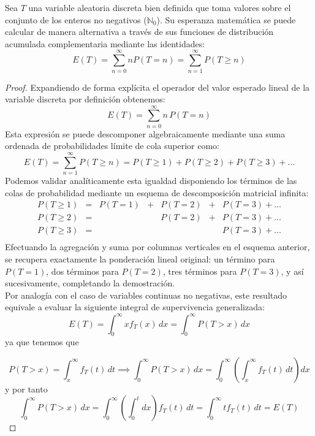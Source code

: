 \begin{lema}
    Sea $T$ una variable aleatoria discreta bien definida que toma valores sobre el conjunto de los enteros no negativos ($\mathbb{N}_0$). Su esperanza matemática se puede calcular de manera alternativa a través de sus funciones de distribución acumulada complementaria mediante las identidades:
    \[
    E(T) = \sum_{n=0}^{\infty} nP(T = n) = \sum_{n=1}^{\infty} P(T \geq n)
    \]
\begin{proof}
    Expandiendo de forma explícita el operador del valor esperado lineal de la variable discreta por definición obtenemos:
    \[
    E(T) = \sum_{n=0}^{\infty} n \, P(T = n)
    \]
    Esta expresión se puede descomponer algebraicamente mediante una suma ordenada de probabilidades límite de cola superior como:
    \[
    E(T) = \sum_{n=1}^{\infty} P(T \geq n) = P(T \geq 1) + P(T \geq 2) + P(T \geq 3) + \dots
    \]
    Podemos validar analíticamente esta igualdad disponiendo los términos de las colas de probabilidad mediante un esquema de descomposición matricial infinita:
    \[
    \begin{array}{rcccccc}
        P(T \geq 1) & = & P(T=1) & + & P(T=2) & + & P(T=3) + \dots \\
        P(T \geq 2) & = &                  &   & P(T=2) & + & P(T=3) + \dots \\
        P(T \geq 3) & = &                  &   &                  &   & P(T=3) + \dots \\
    \end{array}
    \]
    Efectuando la agregación y suma por columnas verticales en el esquema anterior, se recupera exactamente la ponderación lineal original: un término para $P(T=1)$, dos términos para $P(T=2)$, tres términos para $P(T=3)$, y así sucesivamente, completando la demostración. \\


    \noindent
    Por analogía con el caso de variables continuas no negativas, este resultado equivale a evaluar la siguiente integral de supervivencia generalizada:
    \[
    E(T)= \int_{0}^{\infty}xf_T(x)\, dx=\int_{0}^{\infty} P(T > x) \, dx 
    \]
    ya que tenemos que

    $$P(T > x) = \int_{x}^{\infty} f_T(t) \, dt \implies \int_{0}^{\infty} P(T > x) \, dx = \int_{0}^{\infty} \left( \int_{x}^{\infty} f_T(t) \, dt \right) dx$$
    y por tanto
    $$\int_{0}^{\infty}P(T>x)\, dx=\int_{0}^{\infty} \left( \int_{0}^{t} dx \right) f_T(t) \, dt=\int_{0}^{\infty} t f_T(t) \, dt=E(T)$$
\end{proof}
\end{lema}


